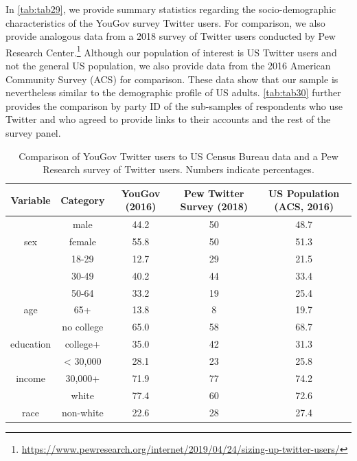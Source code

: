 \documentclass[
  12pt,
]{article}
\begin{document}
In \autoref{tab:tab29}, we provide summary statistics regarding the socio-demographic characteristics of the YouGov survey Twitter users. For comparison, we also provide analogous data from a 2018 survey of Twitter users conducted by Pew Research Center.\footnote{\url{https://www.pewresearch.org/internet/2019/04/24/sizing-up-twitter-users/}} Although our population of interest is US Twitter users and not the general US population, we also provide data from the 2016 American Community Survey (ACS) for comparison. These data show that our sample is nevertheless similar to the demographic profile of US adults. \autoref{tab:tab30} further provides the comparison by party ID of the sub-samples of respondents who use Twitter and who agreed to provide links to their accounts and the rest of the survey panel.

\begin{table}[!h]

\caption{\label{tab:unnamed-chunk-4}\label{tab:tab29}Comparison of YouGov Twitter users to US Census Bureau data and a Pew Research survey of Twitter users. Numbers indicate percentages.}
\centering
\fontsize{10}{12}\selectfont
\begin{tabular}[t]{c|c|c|c|c}
\hline
Variable & Category & YouGov (2016) & Pew Twitter Survey (2018) & US Population (ACS, 2016)\\
\hline
 & male & 44.2 & 50 & 48.7\\

\multirow{-2}{*}{\centering\arraybackslash sex} & female & 55.8 & 50 & 51.3\\

\hline
 & 18-29 & 12.7 & 29 & 21.5\\

 & 30-49 & 40.2 & 44 & 33.4\\

 & 50-64 & 33.2 & 19 & 25.4\\

\multirow{-4}{*}{\centering\arraybackslash age} & 65+ & 13.8 & 8 & 19.7\\

\hline
 & no college & 65.0 & 58 & 68.7\\

\multirow{-2}{*}{\centering\arraybackslash education} & college+ & 35.0 & 42 & 31.3\\

\hline
 & < 30,000 & 28.1 & 23 & 25.8\\

\multirow{-2}{*}{\centering\arraybackslash income} & 30,000+ & 71.9 & 77 & 74.2\\

\hline
 & white & 77.4 & 60 & 72.6\\

\multirow{-2}{*}{\centering\arraybackslash race} & non-white & 22.6 & 28 & 27.4\\
\hline
\end{tabular}
\end{table}
\end{document}
